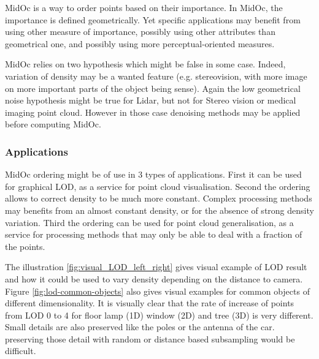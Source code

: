 		MidOc is a way to order points based on their importance. In MidOc,
		the importance is defined geometrically.
		Yet specific applications may benefit from using other measure of importance, 
		possibly using other attributes than geometrical one,
		and possibly using more perceptual-oriented measures.
		
		MidOc relies on two hypothesis which might be false in some case. 
		Indeed, variation of density may be a wanted feature
		(e.g. stereovision, with more image on more important parts of the object being sense).
		Again the low geometrical noise hypothesis might be true for Lidar, but not for Stereo vision 
		or medical imaging point cloud. However in those case denoising methods may be applied before computing MidOc.

	\subsubsection{Applications}
		MidOc ordering might be of use in 3 types of applications. First it can be used for graphical LOD, as a service for point cloud visualisation.
		Second the ordering allows to correct density to be much more constant.
		Complex processing methods may benefits from an almost constant density, or for the absence of strong density variation.
		Third the ordering can be used for point cloud generalisation,
		as a service for processing methods that may only be able to deal with a fraction of the points. 
		
		The illustration \ref{fig:visual_LOD_left_right} gives visual example of LOD result and how it could be used to vary density depending on the distance to camera. 
		Figure \ref{fig:lod-common-objects} also gives visual examples for common objects of different dimensionality.
		It is visually clear that the rate of increase of points from LOD 0 to 4 for floor lamp (1D) window (2D) and tree (3D) is very different.
		Small details are also preserved like the poles or the antenna of the car. preserving those detail with random or distance based subsampling would be difficult.
		
		 
